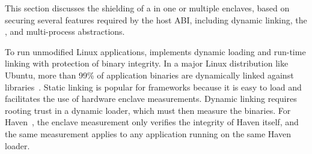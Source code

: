 \label{sec:sgx:shield}


This section discusses
the shielding of a \libos{} in one or multiple enclaves,
based on
securing several features
required by the host ABI, including dynamic linking, the \hostapis{}, and multi-process abstractions.




\label{sec:sgx:shield:loading}


To run unmodified Linux applications,
\graphenesgx{} implements dynamic loading and run-time linking
with protection of binary integrity.
In a major Linux distribution like Ubuntu, more than 99\% of application binaries are dynamically linked against libraries~\cite{tsai16apistudy}.
Static linking is popular for \sgx{} frameworks because it is easy to load and 
facilitates the use of hardware enclave measurements. %
Dynamic linking requires rooting trust in a dynamic loader, which must then measure the binaries.
For Haven~\cite{baumann14haven}, the enclave measurement only verifies the integrity of Haven itself,
and the same measurement
applies to any application running on the same Haven loader.



